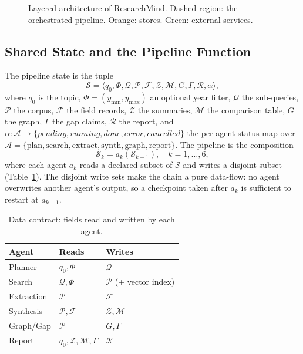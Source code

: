\documentclass[conference]{IEEEtran}
\newcommand{\RM}{ResearchMind}
\newcommand{\cP}{\mathcal{P}}
\newcommand{\cQ}{\mathcal{Q}}
\newcommand{\cF}{\mathcal{F}}
\newcommand{\cS}{\mathcal{S}}
\newcommand{\cR}{\mathcal{R}}
\newcommand{\cM}{\mathcal{M}}
\newcommand{\cZ}{\mathcal{Z}}
\begin{document}
\begin{figure}[!t]
\caption{Layered architecture of \RM. Dashed region: the orchestrated pipeline. Orange: stores. Green: external services.}
\label{fig:arch}
\end{figure}

\subsection{Shared State and the Pipeline Function}
The pipeline state is the tuple
\begin{equation}
\cS=\langle q_0,\Phi,\cQ,\cP,\cF,\cZ,\cM,G,\Gamma,\cR,\alpha\rangle ,
\label{eq:state}
\end{equation}
where $q_0$ is the topic, $\Phi=(y_{\min},y_{\max})$ an optional year filter, $\cQ$ the sub-queries, $\cP$ the corpus, $\cF$ the field records, $\cZ$ the summaries, $\cM$ the comparison table, $G$ the graph, $\Gamma$ the gap claims, $\cR$ the report, and $\alpha:\mathcal{A}\to\{\textit{pending},\textit{running},\textit{done},\textit{error},\textit{cancelled}\}$ the per-agent status map over $\mathcal{A}=\{\text{plan},\text{search},\text{extract},\text{synth},\text{graph},\text{report}\}$. The pipeline is the composition
\begin{equation}
\cS_k=a_k(\cS_{k-1}),\quad k=1,\dots,6,
\label{eq:pipeline}
\end{equation}
where each agent $a_k$ reads a declared subset of $\cS$ and writes a disjoint subset (Table~\ref{tab:rw}). The disjoint write sets make the chain a pure data-flow: no agent overwrites another agent's output, so a checkpoint taken after $a_k$ is sufficient to restart at $a_{k+1}$.

\begin{table}[!t]
\caption{Data contract: fields read and written by each agent.}
\label{tab:rw}
\centering
\small
\begin{tabular}{@{}lll@{}}
\toprule
Agent & Reads & Writes \\
\midrule
Planner    & $q_0,\Phi$ & $\cQ$ \\
Search     & $\cQ,\Phi$ & $\cP$ (+ vector index) \\
Extraction & $\cP$ & $\cF$ \\
Synthesis  & $\cP,\cF$ & $\cZ,\cM$ \\
Graph/Gap  & $\cP$ & $G,\Gamma$ \\
Report     & $q_0,\cZ,\cM,\Gamma$ & $\cR$ \\
\bottomrule
\end{tabular}
\end{table}
\end{document}
